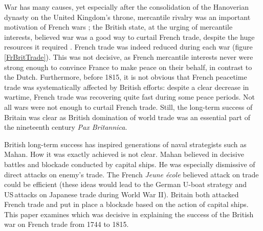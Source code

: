 \documentclass[12pt,a4paper,notitlepage,english]{article}
\begin{document}
War has many causes, yet especially after the consolidation of the Hanoverian dynasty on the United Kingdom’s throne, mercantile rivalry was an important motivation of French wars \citep{Wallerstein1980, Tracy1991, Davis2006, Crouzet2008}; the British state, at the urging of mercantile interests, believed war was a good way to curtail French trade, despite the huge resources it required \citep{Baugh1965, Neal1977, Brewer2002}.
French trade was indeed reduced during each war (figure \ref{FrBritTrade}).
This was not decisive, as French mercantile interests never were strong enough to convince France to make peace on their behalf, in contrast to the Dutch.
Furthermore, before 1815, it is not obvious that French peacetime trade was systematically affected by British efforts: despite a clear decrease in wartime, French trade was recovering quite fast during some peace periods.
Not all wars were not enough to curtail French trade.
Still, the long-term success of Britain was clear as British domination of world trade was an essential part of the nineteenth century \emph{Pax Britannica}.

British long-term success has inspired generations of naval strategists such as Mahan.
How it was exactly achieved is not clear.
Mahan believed in decisive battles and blockade conducted by capital ships.
He was especially dismissive of direct attacks on enemy's trade.
The French \textit{Jeune école} believed attack on trade could be efficient \cite{Aube1882} (these ideas would lead to the German U-boat strategy and US attacks on Japanese trade during World War II).
Britain both attacked French trade and put in place a blockade based on the action of capital ships.
This paper examines which was decisive in explaining the success of the British war on French trade from 1744 to 1815.
 
\end{document}
